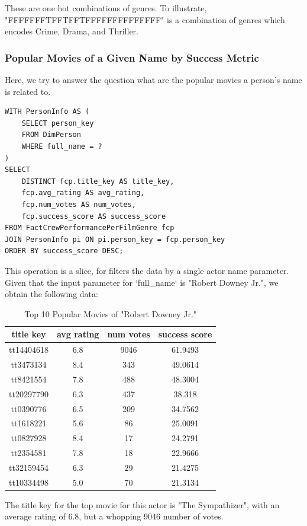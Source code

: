 These are one hot combinations of genres. To illustrate, "FFFFFFFTFFTFFTFFFFFFFFFFFFFF" is a combination of genres which encodes Crime, Drama, and Thriller. 

\subsubsection{Popular Movies of a Given Name by Success Metric}

Here, we try to answer the question what are the popular movies a person's name is related to.  

\begin{lstlisting}[style=SQLStyle]
WITH PersonInfo AS (
	SELECT person_key
	FROM DimPerson
	WHERE full_name = ?
)
SELECT
	DISTINCT fcp.title_key AS title_key,
	fcp.avg_rating AS avg_rating,
	fcp.num_votes AS num_votes,
	fcp.success_score AS success_score
FROM FactCrewPerformancePerFilmGenre fcp
JOIN PersonInfo pi ON pi.person_key = fcp.person_key
ORDER BY success_score DESC;
\end{lstlisting}


This operation is a slice, for filters the data by a single actor name parameter. Given that the input parameter for `full\_name` is "Robert Downey Jr.", we obtain the following data:

\begin{table}[h!]
	\centering
	\begin{tabular}{|c|c|c|c|}
		\hline
		title key & avg rating & num votes & success score \\
		\hline
		tt14404618 & 6.8 & 9046 & 61.9493 \\
		tt3473134 & 8.4 & 343 & 49.0614 \\
		tt8421554 & 7.8 & 488 & 48.3004 \\
		tt20297790 & 6.3 & 437 & 38.318 \\
		tt0390776 & 6.5 & 209 & 34.7562 \\
		tt1618221 & 5.6 & 86 & 25.0091 \\
		tt0827928 & 8.4 & 17 & 24.2791 \\
		tt2354581 & 7.8 & 18 & 22.9666 \\
		tt32159454 & 6.3 & 29 & 21.4275 \\
		tt10334498 & 5.0 & 70 & 21.3134 \\
	\hline
\end{tabular}
\caption{Top 10 Popular Movies of "Robert Downey Jr."}
\end{table}

The title key for the top movie for this actor is "The Sympathizer", with an average rating of 6.8, but a whopping 9046 number of votes. 

